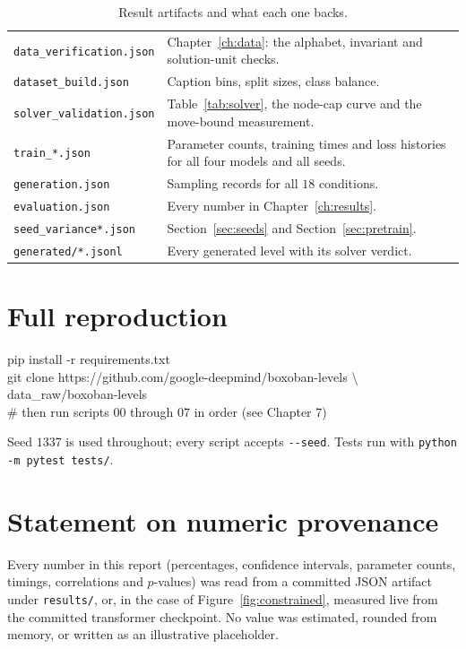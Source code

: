 \documentclass[11pt,a4paper]{report}
\begin{document}
\begin{table}[!htb]
\centering\small
\caption{Result artifacts and what each one backs.}
\label{tab:artifacts}
\begin{tabularx}{\textwidth}{@{}l X@{}}
\toprule
\texttt{data\_verification.json} & Chapter~\ref{ch:data}: the alphabet, invariant
and solution-unit checks. \\
\texttt{dataset\_build.json} & Caption bins, split sizes, class balance. \\
\texttt{solver\_validation.json} & Table~\ref{tab:solver}, the node-cap curve and
the move-bound measurement. \\
\texttt{train\_*.json} & Parameter counts, training times and loss histories for
all four models and all seeds. \\
\texttt{generation.json} & Sampling records for all $18$ conditions. \\
\texttt{evaluation.json} & Every number in Chapter~\ref{ch:results}. \\
\texttt{seed\_variance*.json} & Section~\ref{sec:seeds} and
Section~\ref{sec:pretrain}. \\
\texttt{generated/*.jsonl} & Every generated level with its solver verdict. \\
\bottomrule
\end{tabularx}
\end{table}

\section{Full reproduction}

\begin{center}
\colorbox{softgrey}{\parbox{0.9\textwidth}{\ttfamily\footnotesize
pip install -r requirements.txt\\[2pt]
git clone https://github.com/google-deepmind/boxoban-levels \textbackslash\\
\hspace*{2em}data\_raw/boxoban-levels\\[2pt]
\# then run scripts 00 through 07 in order (see Chapter 7)
}}
\end{center}

Seed $1337$ is used throughout; every script accepts \texttt{-{}-seed}. Tests run
with \texttt{python -m pytest tests/}.

\section{Statement on numeric provenance}

Every number in this report (percentages, confidence intervals, parameter
counts, timings, correlations and $p$-values) was read from a committed JSON
artifact under \texttt{results/}, or, in the case of
Figure~\ref{fig:constrained}, measured live from the committed transformer
checkpoint. No value was estimated, rounded from memory, or written as an
illustrative placeholder.
\end{document}
